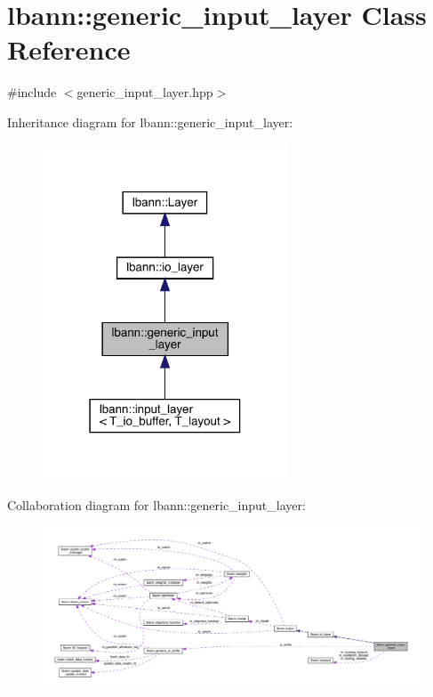 \hypertarget{classlbann_1_1generic__input__layer}{}\section{lbann\+:\+:generic\+\_\+input\+\_\+layer Class Reference}
\label{classlbann_1_1generic__input__layer}


{\ttfamily \#include $<$generic\+\_\+input\+\_\+layer.\+hpp$>$}



Inheritance diagram for lbann\+:\+:generic\+\_\+input\+\_\+layer\+:\nopagebreak
\begin{figure}[H]
\begin{center}
\leavevmode
\includegraphics[width=207pt]{classlbann_1_1generic__input__layer__inherit__graph}
\end{center}
\end{figure}


Collaboration diagram for lbann\+:\+:generic\+\_\+input\+\_\+layer\+:\nopagebreak
\begin{figure}[H]
\begin{center}
\leavevmode
\includegraphics[width=350pt]{classlbann_1_1generic__input__layer__coll__graph}
\end{center}
\end{figure}
